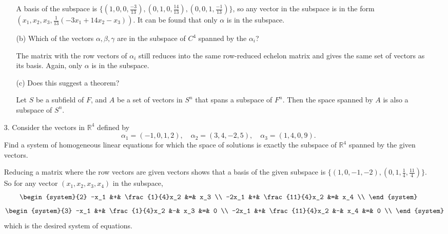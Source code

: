 \documentclass{article}
\begin{document}
\begin{enumerate}[listparindent=\parindent]
\begin{enumerate}[listparindent=\parindent]
            A basis of the subspace is \(\{(1, 0, 0, \frac{-3}{13}), (0, 1, 0, \frac{14}{13}), (0, 0, 1, \frac{-1}{13})\}\),
            so any vector in the subspace is in the form \((x_1, x_2, x_3, \frac{1}{13}(-3x_1 + 14x_2 - x_3))\).
            It can be found that only \(\alpha\) is in the subspace.

        \item[(b)] Which of the vectors \(\alpha, \beta, \gamma\) are in the subspace of \(C^4\) spanned by the \(\alpha_i\)?

            The matrix with the row vectors of \(\alpha_i\) still reduces into the same row-reduced echelon matrix and
            gives the same set of vectors as its basis. Again, only \(\alpha\) is in the subspace.

        \item[(c)] Does this suggest a theorem?

            Let \(S\) be a subfield of \(F\), and \(A\) be a set of vectors in \(S^n\) that spans a subspace of \(F^n\).
            Then the space spanned by \(A\) is also a subspace of \(S^n\).

    \end{enumerate}

\item[3.] Consider the vectors in \(\mathbb{R}^4\) defined by
    \[
        \alpha_1 = (-1, 0, 1, 2),\quad \alpha_2 = (3, 4, -2, 5),\quad \alpha_3 = (1, 4, 0, 9).
    \]
    Find a system of homogeneous linear equations for which the space of solutions is
    exactly the subspace of \(\mathbb{R}^4\) spanned by the given vectors.

    Reducing a matrix where the row vectors are given vectors shows that
    a basis of the given subspace is \(\{(1, 0, -1, -2), (0, 1, \frac{1}{4}, \frac{11}{4})\}\).
    So for any vector \((x_1, x_2, x_3, x_4)\) in the subspace,
    \[
        \begin{system}{2}
            -x_1 &+& \frac{1}{4}x_2 &=& x_3 \\
            -2x_1 &+& \frac{11}{4}x_2 &=& x_4 \\
        \end{system}
    \]
    \[
        \begin{system}{3}
            -x_1 &+& \frac{1}{4}x_2 &-& x_3 &=& 0 \\
            -2x_1 &+& \frac{11}{4}x_2 &-& x_4 &=& 0 \\
        \end{system}
    \]
    which is the desired system of equations.


\end{enumerate}
\end{document}
